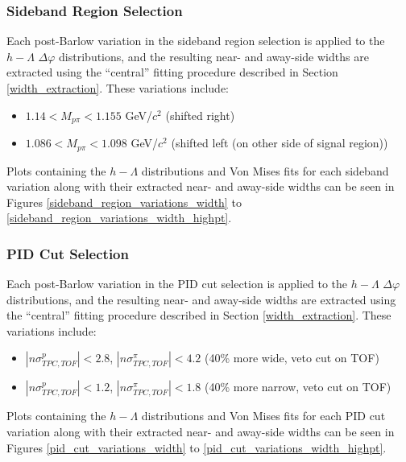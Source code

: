 \documentclass[ALICE,manyauthors]{ALICE_analysis_notes}
\begin{document}
\subsubsection{Sideband Region Selection}
\label{sideband_region_selection_systematics_width}
Each post-Barlow variation in the sideband region selection is applied to the $h-\Lambda$ $\Delta\varphi$ distributions, and the resulting near- and away-side widths are extracted using the ``central'' fitting procedure described in Section \ref{width_extraction}. These variations include:
\begin{itemize}
\item $1.14 < M_{p\pi} < 1.155$ GeV/$c^2$ (shifted right)
\item $1.086 < M_{p\pi} < 1.098$ GeV/$c^2$ (shifted left (on other side of signal region))
\end{itemize}
Plots containing the $h-\Lambda$ distributions and Von Mises fits for each sideband variation along with their extracted near- and away-side widths can be seen in Figures \ref{sideband_region_variations_width} to \ref{sideband_region_variations_width_highpt}.

\subsubsection{PID Cut Selection}
\label{pid_cut_selection_systematics_width}
Each post-Barlow variation in the PID cut selection is applied to the $h-\Lambda$ $\Delta\varphi$ distributions, and the resulting near- and away-side widths are extracted using the ``central'' fitting procedure described in Section \ref{width_extraction}. These variations include:
\begin{itemize}
\item $|n\sigma_{TPC, TOF}^{p}| < 2.8$, $|n\sigma_{TPC, TOF}^{\pi}| < 4.2$ (40\% more wide, veto cut on TOF)
\item $|n\sigma_{TPC, TOF}^{p}| < 1.2$, $|n\sigma_{TPC,TOF}^{\pi}| < 1.8$ (40\% more narrow, veto cut on TOF)
\end{itemize}
Plots containing the $h-\Lambda$ distributions and Von Mises fits for each PID cut variation along with their extracted near- and away-side widths can be seen in Figures \ref{pid_cut_variations_width} to \ref{pid_cut_variations_width_highpt}.
\end{document}

